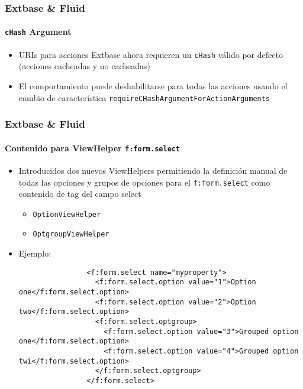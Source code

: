 \begin{frame}[fragile]
	\frametitle{Extbase \& Fluid}
	\framesubtitle{\texttt{cHash} Argument}

	\begin{itemize}
		\item URIs para acciones Extbase ahora requieren un \texttt{cHash} válido por defecto\newline
			(acciones cacheadas y no cacheadas)
		\item El comportamiento puede deshabilitarse para todas las acciones usando el cambio de característica
			\texttt{requireCHashArgumentForActionArguments}
	\end{itemize}

\end{frame}

\begin{frame}[fragile]
	\frametitle{Extbase \& Fluid}
	\framesubtitle{Contenido para ViewHelper \texttt{f:form.select}}

	\lstset{basicstyle=\tiny\ttfamily}

	\begin{itemize}
		\item Introducidos dos nuevos ViewHelpers permitiendo la definición manual de todas las opciones y
		    grupos de opciones para el \texttt{f:form.select} como contenido de tag del campo select

			\begin{itemize}
				\item \texttt{OptionViewHelper}
				\item \texttt{OptgroupViewHelper}
			\end{itemize}

		\item Ejemplo:

			\begin{lstlisting}
				<f:form.select name="myproperty">
				  <f:form.select.option value="1">Option one</f:form.select.option>
				  <f:form.select.option value="2">Option two</f:form.select.option>
				  <f:form.select.optgroup>
				    <f:form.select.option value="3">Grouped option one</f:form.select.option>
				    <f:form.select.option value="4">Grouped option twi</f:form.select.option>
				  </f:form.select.optgroup>
				</f:form.select>
			\end{lstlisting}

		\end{itemize}

\end{frame}


